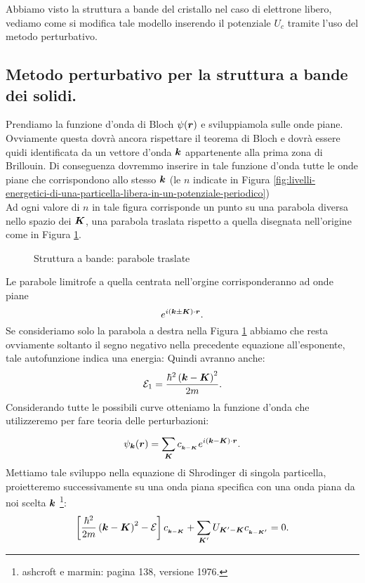 Abbiamo visto la struttura a bande del cristallo nel caso di elettrone libero, vediamo come si modifica tale modello inserendo il potenziale $U_c$ tramite l'uso del metodo perturbativo.\\
\subsection{Metodo perturbativo per la struttura a bande dei solidi.}
\label{subsec:Metodo perturbativo per la struttura a bande dei solidi.}
Prendiamo la funzione d'onda di Bloch $\psi(\boldsymbol{r})$ e sviluppiamola sulle onde piane. 
Ovviamente questa dovrà ancora rispettare il teorema di Bloch e dovrà essere quidi identificata da un vettore d'onda $\boldsymbol{k}$ appartenente alla prima zona di Brillouin. 
Di conseguenza dovremmo inserire in tale funzione d'onda tutte le onde piane che corrispondono allo stesso $\boldsymbol{k}$ (le $n$ indicate in Figura \ref{fig:livelli-energetici-di-una-particella-libera-in-un-potenziale-periodico})\\
Ad ogni valore di $n$ in tale figura corrisponde un punto su una parabola diversa nello spazio dei $\boldsymbol{K}$, una parabola traslata rispetto a quella disegnata nell'origine come in Figura \ref{fig:struttura-a-bande-parabole-traslate}.\\
\begin{figure}[ht]
    \centering
    \caption{Struttura a bande: parabole traslate}
    \label{fig:struttura-a-bande-parabole-traslate}
\end{figure}
Le parabole limitrofe a quella centrata nell'orgine corrisponderanno ad onde piane 
\[
	e^{i\left( \boldsymbol{k}\pm\boldsymbol{K} \right) \cdot\boldsymbol{r}}
.\] 
Se consideriamo solo la parabola a destra nella Figura \ref{fig:struttura-a-bande-parabole-traslate} abbiamo che resta ovviamente soltanto il segno negativo nella precedente equazione all'esponente, tale autofunzione indica una energia:
Quindi avranno anche:
\[
	\mathcal{E}_1=\frac{\hbar ^2\left( \boldsymbol{k}-\boldsymbol{K} \right)^2}{2m}
.\] 
Considerando tutte le possibili curve otteniamo la funzione d'onda che utilizzeremo per fare teoria delle perturbazioni:
\[
	\psi_{\boldsymbol{k}}(\boldsymbol{r}) = 
	\sum_{\boldsymbol{K}}^{} c_{_{\boldsymbol{k}-\boldsymbol{K}}}
	e^{i\left( \boldsymbol{k}-\boldsymbol{K} \right)\cdot\boldsymbol{r}}
.\] 
Mettiamo tale sviluppo nella equazione di Shrodinger di singola particella, proietteremo successivamente su una onda piana specifica con una onda piana da noi scelta $\boldsymbol{k}$ \footnote{ashcroft e marmin: pagina 138, versione 1976.}:
\[
	\left[ \frac{\hbar ^2}{2m}\left( \boldsymbol{k}-\boldsymbol{K} \right)^2 - \mathcal{E} \right] 
	c_{_{\boldsymbol{k}-\boldsymbol{K}}}+
	\sum_{\boldsymbol{K}'}^{} U_{\boldsymbol{K}'-\boldsymbol{K}}c_{_{\boldsymbol{k}-\boldsymbol{K}'}} = 0
	\label{eq:shrodi-bande}
.\] 
